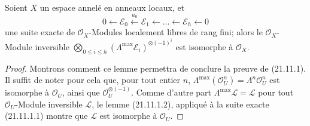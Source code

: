 \begin{lemma}[21.11.1.2]
\label{IV.21.11.1.2}
Soient $X$ un espace annelé en anneaux locaux, et
\[
  0\leftarrow\mathscr E_0\xleftarrow{u_0}\mathscr E_1
  \leftarrow\ldots\leftarrow\mathscr E_h\leftarrow0
\]
une suite exacte de $\mathcal O_X$-Modules localement libres de rang fini; alors le
$\mathcal O_X$-Module inversible
$\bigotimes_{0\leq i\leq h}(\Lambda^{\max}\mathscr E_i)^{\otimes(-1)^i}$
est isomorphe à $\mathcal O_X$.
\end{lemma}

\begin{proof}
Montrons comment ce lemme permettra de conclure la preuve de (21.11.1). Il suffit de
noter pour cela que, pour tout entier $n$,
$\Lambda^{\max}(\mathcal O_U^n)=\Lambda^n\mathcal O_U^n$ est isomorphe à
$\mathcal O_U$, ainsi que $\mathcal O_U^{\otimes(-1)}$. Comme d'autre part
$\Lambda^{\max}\mathscr L=\mathscr L$ pour tout $\mathcal O_U$-Module inversible
$\mathscr L$, le lemme (21.11.1.2), appliqué à la suite exacte (21.11.1.1) montre
que $\mathscr L$ est isomorphe à $\mathcal O_U$.


\end{proof}
